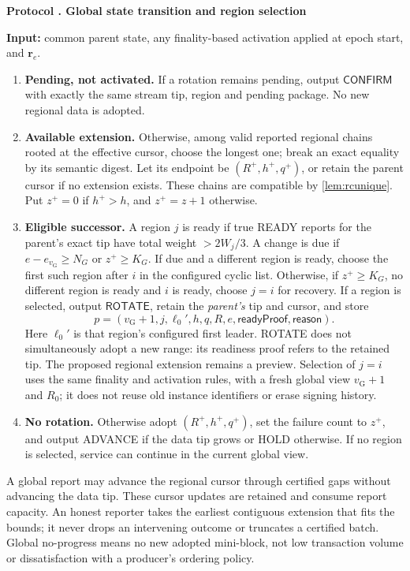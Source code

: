 \documentclass[11pt,a4paper,onecolumn]{article}
\newcommand{\gv}{v_{\mathrm G}}
\newcommand{\Tag}[1]{\mathsf{#1}}
\theoremstyle{remark}\newtheorem{example}[definition]{Example}
\newcounter{protocol}
\newenvironment{protocol}[2]{\refstepcounter{protocol}\label{#1}\begin{mdframed}[nobreak=true,linewidth=.6pt,skipabove=10pt,skipbelow=10pt,innertopmargin=8pt,innerbottommargin=8pt]\small\raggedright\noindent\textbf{Protocol \theprotocol. #2}\par\smallskip}{\end{mdframed}}
\begin{document}
\begin{protocol}{alg:gtransition}{Global state transition and region selection}
\textbf{Input:} common parent state, any finality-based activation applied at
epoch start, and $\mathbf r_e$.
\begin{enumerate}[label=\textbf{T\arabic*.}]
\item \textbf{Pending, not activated.} If a rotation remains pending, output
$\Tag{CONFIRM}$ with exactly the same stream tip, region and pending package.
No new regional data is adopted.
\item \textbf{Available extension.} Otherwise, among valid reported regional
chains rooted at the effective cursor, choose the longest one; break an exact
equality by its semantic digest. Let its endpoint be $(R^+,h^+,q^+)$, or retain
the parent cursor if no extension exists. These chains are compatible by
\cref{lem:rcunique}. Put $z^+=0$ if $h^+>h$, and $z^+=z+1$ otherwise.
\item \textbf{Eligible successor.} A region $j$ is ready if true READY
reports for the parent's exact tip have total weight $>2W_j/3$.
A change is due if $e-e_{\gv}\geq N_G$ or $z^+\geq K_G$.
If due and a different region is ready, choose the first such region after $i$
in the configured cyclic list. Otherwise, if $z^+\geq K_G$, no different region
is ready and $i$ is ready, choose $j=i$ for recovery. If a region is selected,
output $\Tag{ROTATE}$, retain the \emph{parent's} tip and cursor, and store
\[
 p=(\gv+1,j,\ell_0',h,q,R,e,\mathsf{readyProof},\mathsf{reason}).
\]
Here $\ell_0'$ is that region's configured first leader. ROTATE does not
simultaneously adopt a new range: its readiness proof refers to the retained tip.
The proposed regional extension remains a preview. Selection of $j=i$ uses
the same finality and activation rules, with a fresh global view $\gv+1$ and $R_0$;
it does not reuse old instance identifiers or erase signing history.
\item \textbf{No rotation.} Otherwise adopt $(R^+,h^+,q^+)$, set the failure
count to $z^+$, and output ADVANCE if the data tip grows or HOLD otherwise.
If no region is selected, service can continue in the current global view.
\end{enumerate}
\end{protocol}

A global report may advance the regional cursor through certified gaps without
advancing the data tip. These cursor updates are retained and consume report
capacity. An honest reporter takes the earliest contiguous extension that fits
the bounds; it never drops an intervening outcome or truncates a certified batch.
Global no-progress means no new adopted mini-block, not low transaction volume
or dissatisfaction with a producer's ordering policy.
\end{document}
